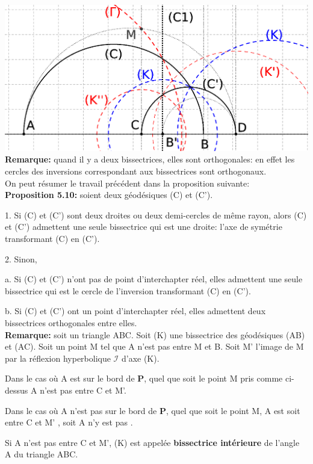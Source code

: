 \documentclass[a4paper, 12pt, twoside]{book}
\begin{document}
\includegraphics[scale=0.5]{figures/bis5.eps} \\

\textbf{Remarque:} quand il y a deux bissectrices, elles sont orthogonales: en effet les cercles des inversions correspondant aux bissectrices sont orthogonaux.\\



On peut résumer le travail précédent dans la proposition suivante:\\


\textbf{Proposition 5.10:} soient deux géodésiques (C) et (C').\

1. Si (C) et (C') sont deux droites ou deux demi-cercles de même rayon, alors (C) et (C') admettent une seule bissectrice qui est une droite: l'axe de symétrie transformant (C) en (C').\

2. Sinon,\

a. Si (C) et (C') n'ont pas de point d'interchapter réel, elles admettent une seule  bissectrice qui est le cercle de l'inversion transformant (C) en (C').\

b. Si (C) et (C') ont un point d'interchapter réel, elles admettent deux bissectrices orthogonales entre elles.\\

\textbf{Remarque:} soit un triangle ABC. Soit (K) une bissectrice des géodésiques (AB) et (AC). Soit un point M tel que A n'est pas entre M et B. Soit  M' l'image de M par la réflexion hyperbolique $\mathcal{I}$ d'axe (K). \

Dans le cas où A est sur le bord de \textbf{P}, quel que soit le point M pris comme ci-dessus A n'est pas entre C et M'.\

Dans le cas où A n'est pas sur le bord de \textbf{P}, quel que soit le point M, A est soit entre C et M' , soit A n'y est pas .\

Si A n'est pas entre C et M', (K) est appelée \textbf{bissectrice intérieure} de l'angle A du triangle ABC.\\
\end{document}
